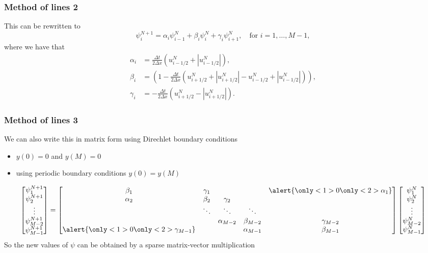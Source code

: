 \documentclass[hyperref={pdfstartview=Fit}]{beamer}
\providecommand{\abs}[1]{\left\lvert#1\right\rvert}
\begin{document}
\begin{frame}
\frametitle{Method of lines 2}
This can be rewritten to 
\begin{equation*}
\psi_i^{N+1} = \alpha_i \psi_{i-1}^N + \beta_i \psi_i^N +\gamma_i \psi_{i+1}^N, \quad \text{for } i=1,\ldots,M-1,
\end{equation*}
 where we have that
\begin{align*}
\alpha_i &= \frac{\Delta t}{2 \Delta x} \left( u_{i-1/2}^N + \abs{u_{i-1/2}^N} \right),\\
 \beta_i &= \left(1 - \frac{\Delta t}{2 \Delta x} \left( u_{i+1/2}^N + \abs{u_{i+1/2}^N} - u_{i-1/2}^N + \abs{u_{i-1/2}^N} \right) \right),\\
\gamma_i &= -\frac{\Delta t}{2 \Delta x} \left( u_{i+1/2}^N - \abs{u_{i+1/2}^N} \right).
\end{align*}
\end{frame}

\begin{frame}
\frametitle{Method of lines 3}
We can also write this in matrix form using Direchlet boundary conditions
\begin{itemize}
\item {}\alert{$y(0)=0$ and $y(M)=0$}
\item {}\alert{using periodic boundary conditions $y(0)=y(M)$}
\end{itemize}
\begin{equation*}
\begin{bmatrix}\psi_{1}^{N+1}\\\psi_{2}^{N+1}\\ \vdots \\\psi_{M-2}^{N+1}\\\psi_{M-1}^{N+1}\end{bmatrix} =
\begin{bmatrix}\beta_1&\gamma_1&&&\alert{\only<1>{0}\only<2>{\alpha_1}}\\ \alpha_2&\beta_2&\gamma_2\\ &\ddots&\ddots&\ddots\\&&\alpha_{M-2}&\beta_{M-2}&\gamma_{M-2}\\\alert{\only<1>{0}\only<2>{\gamma_{M-1}}}&&&\alpha_{M-1}&\beta_{M-1}\\ \end{bmatrix}
\begin{bmatrix}\psi_{1}^N\\\psi_{2}^N\\ \vdots \\\psi_{M-2}^N\\\psi_{M-1}^N\end{bmatrix}
\end{equation*}
So the new values of $\psi$ can be obtained by a sparse matrix-vector multiplication 
\end{frame}
\end{document}
